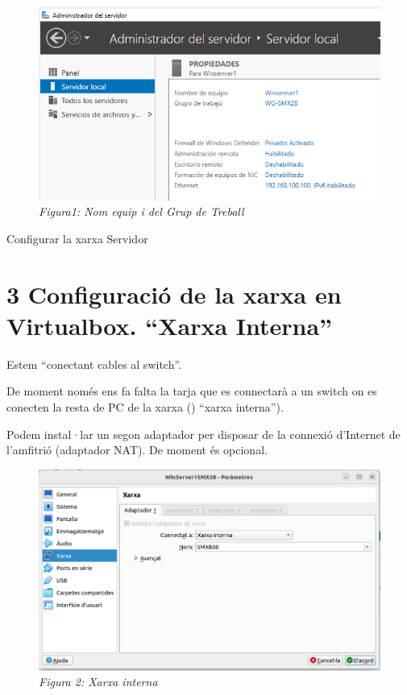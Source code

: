 \documentclass[
  a4paper,
]{article}
\begin{document}
\begin{figure}
\centering
\includegraphics{png/ADDS/WorkgroupNomEquip.png}
\caption{\emph{Figura1: Nom equip i del Grup de Treball}}
\end{figure}

Configurar la xarxa Servidor

\section{3 Configuració de la xarxa en Virtualbox. ``Xarxa
Interna''}\label{configuraciuxf3-de-la-xarxa-en-virtualbox.-xarxa-interna}

Estem ``conectant cables al switch''.

De moment només ens fa falta la tarja que es connectarà a un switch on
es conecten la resta de PC de la xarxa () ``xarxa interna'').

Podem instal·lar un segon adaptador per disposar de la connexió
d'Internet de l'amfitrió (adaptador NAT). De moment és opcional.

\begin{figure}
\centering
\includegraphics{png/ADDS/xarxainterna.png}
\caption{\emph{Figura 2: Xarxa interna}}
\end{figure}
\end{document}
